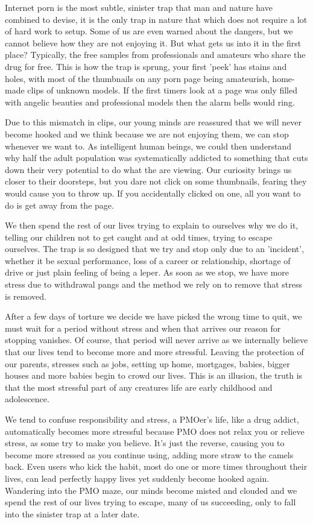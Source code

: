 \documentclass[easypeasy.tex]{subfiles}
\begin{document}
Internet porn is the most subtle, sinister trap that man and nature have combined to devise, it is the only trap in nature that which does not require a lot of hard work to setup. Some of us are even warned about the dangers, but we cannot believe how they are not enjoying it. But what gets us into it in the first place? Typically, the free samples from professionals and amateurs who share the drug for free. This is how the trap is sprung, your first 'peek' has stains and holes, with most of the thumbnails on any porn page being amateurish, home-made clips of unknown models. If the first timers look at a page was only filled with angelic beauties and professional models then the alarm bells would ring.

Due to this mismatch in clips, our young minds are reassured that we will never become hooked and we think because we are not enjoying them, we can stop whenever we want to.  As intelligent human beings, we could then understand why half the adult population was systematically addicted to something that cuts down their very potential to do what the are viewing. Our curiosity brings us closer to their doorsteps, but you dare not click on some thumbnails, fearing they would cause you to throw up. If you accidentally clicked on one, all you want to do is get away from the page.

We then spend the rest of our lives trying to explain to ourselves why we do it, telling our children not to get caught and at odd times, trying to escape ourselves. The trap is so designed that we try and stop only due to an 'incident', whether it be sexual performance, loss of a career or relationship, shortage of drive or just plain feeling of being a leper. As soon as we stop, we have more stress due to withdrawal pangs and the method we rely on to remove that stress is removed.

After a few days of torture we decide we have picked the wrong time to quit, we must wait for a period without stress and when that arrives our reason for stopping vanishes. Of course, that period will never arrive as we internally believe that our lives tend to become more and more stressful. Leaving the protection of our parents, stresses such as jobs, setting up home, mortgages, babies, bigger houses and more babies begin to crowd our lives. This is an illusion, the truth is that the most stressful part of any creatures life are early childhood and adolescence.

We tend to confuse responsibility and stress, a PMOer's life, like a drug addict, automatically becomes more stressful because PMO does not relax you or relieve stress, as some try to make you believe. It's just the reverse, causing you to become more stressed as you continue using, adding more straw to the camels back. Even users who kick the habit, most do one or more times throughout their lives, can lead perfectly happy lives yet suddenly become hooked again. Wandering into the PMO maze, our minds become misted and clouded and we spend the rest of our lives trying to escape, many of us succeeding, only to fall into the sinister trap at a later date.
\end{document}
